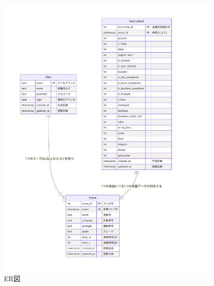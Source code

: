\begin{figure}[p]
    \centering
    \includegraphics[keepaspectratio,height=.9\textheight]{db-nwDesign/er.pdf}
    \caption{ER図}
    \label{fig:ER図}
\end{figure}
